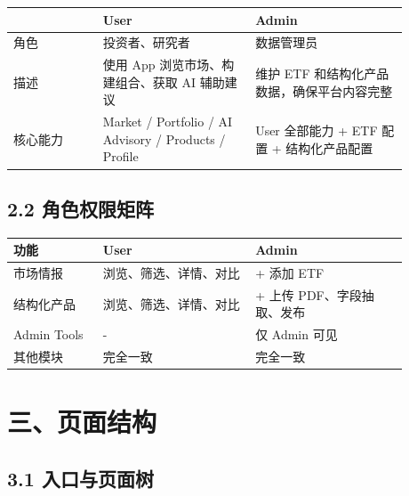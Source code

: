 \begingroup
\small
\begin{longtable}{L{0.20\linewidth}L{0.34\linewidth}L{0.34\linewidth}}
\toprule
 & \textbf{User} & \textbf{Admin} \\
\midrule
角色 & 投资者、研究者 & 数据管理员 \\
描述 & 使用 App 浏览市场、构建组合、获取 AI 辅助建议 & 维护 ETF 和结构化产品数据，确保平台内容完整 \\
核心能力 & Market / Portfolio / AI Advisory / Products / Profile & User 全部能力 + ETF 配置 + 结构化产品配置 \\
\bottomrule
\end{longtable}
\endgroup

\subsection{2.2 角色权限矩阵}

\begingroup
\small
\begin{longtable}{L{0.20\linewidth}L{0.34\linewidth}L{0.34\linewidth}}
\toprule
\textbf{功能} & \textbf{User} & \textbf{Admin} \\
\midrule
市场情报 & 浏览、筛选、详情、对比 & + 添加 ETF \\
结构化产品 & 浏览、筛选、详情、对比 & + 上传 PDF、字段抽取、发布 \\
Admin Tools & - & 仅 Admin 可见 \\
其他模块 & 完全一致 & 完全一致 \\
\bottomrule
\end{longtable}
\endgroup

\section{三、页面结构}

\subsection{3.1 入口与页面树}







